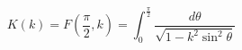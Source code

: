 \documentclass[12pt]{article}
\begin{document}
\begin{displaymath}
K(k) = F(\frac{\pi}{2}, k) = \int_0^\frac{\pi}{2} \frac{d\theta}{\sqrt{1-k^2\sin^2\theta}}
\end{displaymath}
\end{document}
